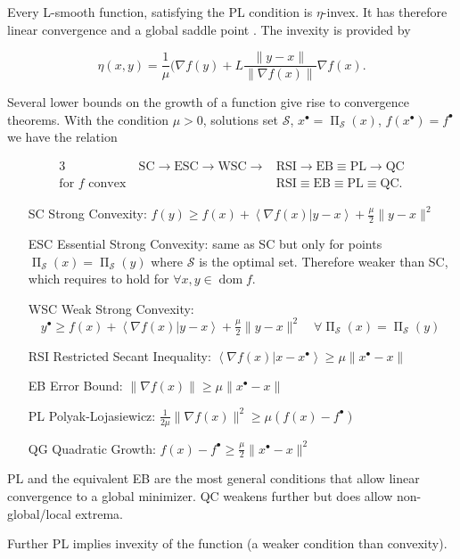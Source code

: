 \documentclass[varwidth=15cm, border=.5cm]{standalone}
\DeclareMathOperator{\proj}{\Pi}
\DeclareMathOperator{\domain}{dom}
\newcommand{\innerp}[2]{\left\langle #1 \vert #2 \right\rangle}
\newcommand{\optimal}[1]{{#1^{\scriptscriptstyle\bullet}}}
\renewcommand*{\cite}{\footfullcite}
\begin{document}
\begin{definition}[label=xt9s0uma, name=Polyak-Lojasiewicz Regularity]
	\begin{remark}[label=z8v9vnod, name=Invexity]
		Every L-smooth function, satisfying the PL condition is
		\(\eta\)-invex. It has therefore linear convergence and a global 
		saddle point \cite{barik2023invex}. The invexity is provided by

		\[
			\eta(x,y) = \frac{1}{\mu}(\nabla f(y)+L\frac{\lVert y - x\rVert}{\lVert\nabla f(x)\rVert}\nabla f(x).
		\]
	\end{remark}
\end{definition}

\begin{remark}[label=9wm37o_t, name=Relationship between optimality bounds]
	Several lower bounds on the growth of a function give rise to
	convergence theorems. With the condition \(\mu>0\), solutions set
	\(\mathcal S\), \(\optimal{x} = \proj_{\mathcal S}(x)\), \(f(\optimal{x}) = \optimal{f}\) we 
	have the relation

	\begin{alignat}{3}
		&\text{SC}\to\text{ESC}\to\text{WSC}\to&\text{RSI}\to\text{EB}\equiv\text{PL}\to\text{QC} \\
		\text{for } f \text{ convex}~&&\text{RSI}\equiv\text{EB}\equiv\text{PL}\equiv\text{QC}.
	\end{alignat}

	\begin{enumerate}
		\item[SC] Strong Convexity: \(f(y) \geq f(x) + \innerp{\nabla f(x)}{y-x} + \frac{\mu}{2}\lVert y-x\rVert^2\)
		\item[ESC] Essential Strong Convexity: same as SC but only for
			points \(\proj_\mathcal{S}(x) = \proj_\mathcal{S}(y)\) where \(\mathcal S\) is the optimal 
			set. Therefore weaker than SC, which requires to hold 
			for \(\forall x,y\in\domain{f}\).
		\item[WSC] Weak Strong Convexity: \(\quad\optimal{y} \geq f(x) +
			\innerp{\nabla f(x)}{y-x} + \frac{\mu}{2}\lVert
			y-x\rVert^2 \quad \forall \proj_{\mathcal S}(x) = \proj_{\mathcal S}(y)\)
		\item[RSI] Restricted Secant Inequality: \(\innerp{\nabla
			f(x)}{x-\optimal{x}} \geq \mu\lVert \optimal{x} - x\rVert\)
		\item[EB] Error Bound: \(\lVert\nabla f(x)\rVert \geq \mu\lVert \optimal{x} - x\rVert\)
		\item[PL] Polyak-Lojasiewicz: \(\frac{1}{2\mu}\lVert\nabla f(x)\rVert^2\geq\mu(f(x) - \optimal{f})\)
		\item[QG] Quadratic Growth: \(f(x) - \optimal{f} \geq \frac{\mu}{2}\lVert \optimal{x} - x\lVert^2\)
	\end{enumerate}

	PL and the equivalent EB are the most general conditions that allow
	linear convergence to a global minimizer. QC weakens further but does
	allow non-global/local extrema.

	Further PL implies invexity of the function (a weaker condition than
	convexity). 
\end{remark}
\end{document}
